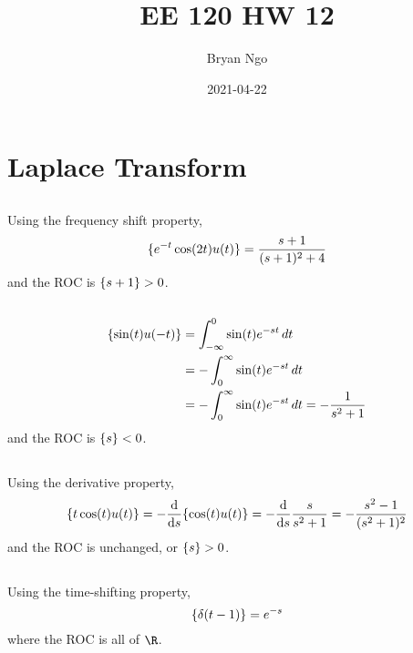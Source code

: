 \documentclass{article}
\title{EE 120 HW 12}
\author{Bryan Ngo}
\date{2021-04-22}
\let\L\relax
\DeclareMathOperator{\L}{\mathcal{L}}
\let\Re\relax
\DeclareMathOperator{\Re}{\mathfrak{R}}
\begin{document}
\maketitle

\section{Laplace Transform}

\subsection{}

Using the frequency shift property,
\begin{equation}
    \L\{e^{-t} \cos(2t) u(t)\} = \frac{s + 1}{(s + 1)^2 + 4}
\end{equation}
and the ROC is \(\Re\{s + 1\} > 0\).

\subsection{}

\begin{align}
    \L\{\sin(t) u(-t)\} &= \int_{-\infty}^0 \sin(t) e^{-st} \, dt \\
    &= -\int_0^\infty \sin(t) e^{-st} \, dt \\
    &= -\int_0^\infty \sin(t) e^{-st} \, dt = -\frac{1}{s^2 + 1}
\end{align}
and the ROC is \(\Re\{s\} < 0\).

\subsection{}

Using the derivative property,
\begin{equation}
    \L\{t \cos(t) u(t)\} = -\dv{s} \L\{\cos(t) u(t)\} = -\dv{s} \frac{s}{s^2 + 1} = -\frac{s^2 - 1}{(s^2 + 1)^2}
\end{equation}
and the ROC is unchanged, or \(\Re\{s\} > 0\).

\subsection{}

Using the time-shifting property,
\begin{equation}
    \L\{\delta(t - 1)\} = e^{-s}
\end{equation}
where the ROC is all of \(\R\).
\end{document}
